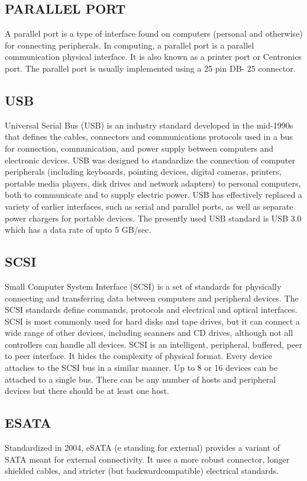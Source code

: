 		\subsection{PARALLEL PORT}
	 A parallel port is a type of interface found on computers (personal and otherwise) for
	connecting peripherals. In computing, a parallel port is a parallel communication physical interface. It is
	also known as a printer port or Centronics port. The parallel port is usually implemented using a 25 pin DB-
	25 connector.
		\subsection{ USB}
	 Universal Serial Bus (USB) is an industry standard developed in the mid-1990s that defines the
	cables, connectors and communications protocols used in a bus for connection, communication, and power
	supply between computers and electronic devices. USB was designed to standardize the connection
	of computer peripherals (including keyboards, pointing devices, digital cameras, printers, portable media
	players, disk drives and network adapters) to personal computers, both to communicate and to
	supply electric power. USB has effectively replaced a variety of earlier interfaces, such as serial and parallel 		ports,
	as well as separate power chargers for portable devices. The presently used USB standard is USB 3.0 which
	has a data rate of upto 5 GB/sec.
		\subsection{ SCSI}
	 Small Computer System Interface (SCSI) is a set of standards for physically connecting and
	transferring data between computers and peripheral devices. The SCSI standards define commands,
	protocols and electrical and optical interfaces. SCSI is most commonly used for hard disks and tape drives,
	but it can connect a wide range of other devices, including scanners and CD drives, although not all
	controllers can handle all devices. SCSI is an intelligent, peripheral, buffered, peer to peer interface. It hides
	the complexity of physical format. Every device attaches to the SCSI bus in a similar manner. Up to 8 or 16
	devices can be attached to a single bus. There can be any number of hosts and peripheral devices but there
	should be at least one host.
		\subsection{ ESATA}
	 Standardized in 2004, eSATA (e standing for external) provides a variant of SATA meant for
	external connectivity. It uses a more robust connector, longer shielded cables, and stricter (but backwardcompatible)
	electrical standards.
